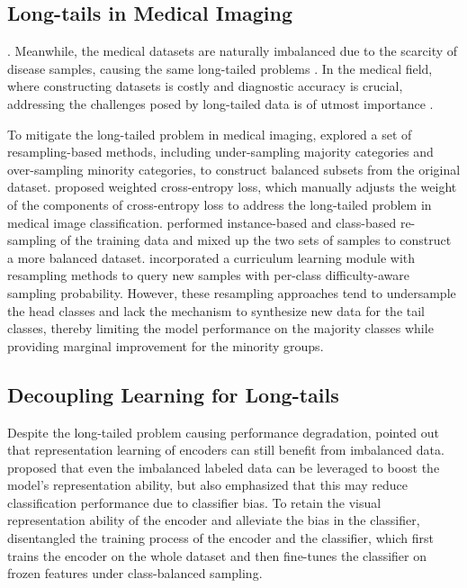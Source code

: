 \subsection{Long-tails in Medical Imaging}
.
Meanwhile, the medical datasets are naturally imbalanced due to the scarcity of disease samples, causing the same long-tailed problems \citep{yang2020rethinking}. In the medical field, where constructing datasets is costly and diagnostic accuracy is crucial, addressing the challenges posed by long-tailed data is of utmost importance \citep{islam2021review}.

To mitigate the long-tailed problem in medical imaging, \cite{khushi2021comparative} explored a set of resampling-based methods, including under-sampling majority categories and over-sampling minority categories, to construct balanced subsets from the original dataset. 
\cite{rezaei2020addressing} proposed weighted cross-entropy loss, which manually adjusts the weight of the components of cross-entropy loss to address the long-tailed problem in medical image classification.
\cite{galdran2021balanced} performed instance-based and class-based re-sampling of the training data and mixed up the two sets of samples to construct a more balanced dataset.
\cite{ju2022flexible} incorporated a curriculum learning module with resampling methods to query new samples with per-class difficulty-aware sampling probability. However, these resampling approaches tend to undersample the head classes and lack the mechanism to synthesize new data for the tail classes, thereby limiting the model performance on the majority classes while providing marginal improvement for the minority groups.

\subsection{Decoupling Learning for Long-tails}
Despite the long-tailed problem causing performance degradation, \cite{tang2020long} pointed out that representation learning of encoders can still benefit from imbalanced data.
\cite{yang2020rethinking} proposed that even the imbalanced labeled data can be leveraged to boost the model's representation ability, but also emphasized that this may reduce classification performance due to classifier bias.  
To retain the visual representation ability of the encoder and alleviate the bias in the classifier, \cite{kang2019decoupling} disentangled the training process of the encoder and the classifier, which first trains the encoder on the whole dataset and then fine-tunes the classifier on frozen features under class-balanced sampling.

